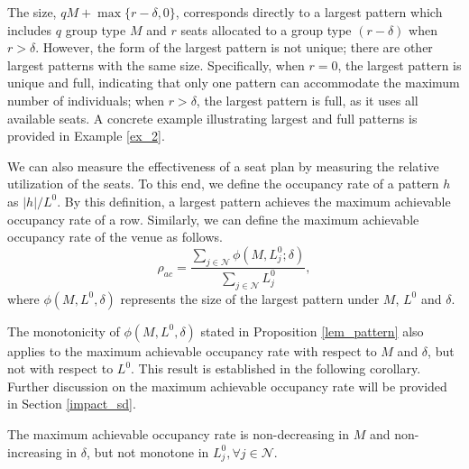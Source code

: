 The size, $qM + \max\{r-\delta, 0\}$, corresponds directly to a largest pattern which includes $q$ group type $M$ and $r$ seats allocated to a group type $(r-\delta)$ when $r>\delta$. However, the form of the largest pattern is not unique; there are other largest patterns with the same size. 
Specifically, when $r = 0$, the largest pattern is unique and full, indicating that only one pattern can accommodate the maximum number of individuals; when $r > \delta$, the largest pattern is full, as it uses all available seats. A concrete example illustrating largest and full patterns is provided in Example \ref{ex_2}. 

We can also measure the effectiveness of a seat plan by measuring the relative utilization of the seats. To this end, we define the occupancy rate of a pattern $h$ as $|h|/L^0$. By this definition, a largest pattern achieves the maximum achievable occupancy rate of a row. Similarly, we can define the maximum achievable occupancy rate of the venue as follows. 
$$\rho_{ac} =  \frac{\sum_{j \in \mathcal{N}}\phi(M, L_{j}^{0}; \delta)}{\sum_{j \in \mathcal{N}} L_{j}^{0}},$$
where $\phi(M, L^{0}, \delta)$ represents the size of the largest pattern under $M$, $L^{0}$ and $\delta$.

The monotonicity of $\phi(M, L^{0}, \delta)$ stated in Proposition \ref{lem_pattern} also applies to the maximum achievable occupancy rate with respect to $M$ and $\delta$, but not with respect to $L^{0}$. This result is established in the following corollary. 
Further discussion on the maximum achievable occupancy rate will be provided in Section \ref{impact_sd}.


\begin{corollary}\label{maximum_phi}
The maximum achievable occupancy rate is non-decreasing in $M$ and non-increasing in $\delta$, but not monotone in $L_{j}^{0}, \forall j \in \mathcal{N}$.
\end{corollary}

 

